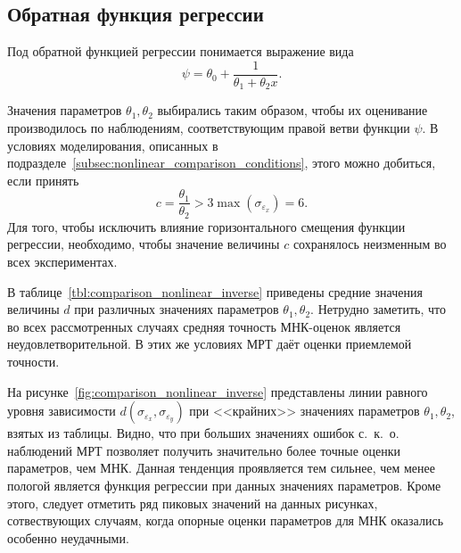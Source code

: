 \vspace{2\baselineskip}
\subsection{Обратная функция регрессии}

Под обратной функцией регрессии понимается выражение вида
\[ \psi = \theta_0 + \dfrac{1}{\theta_1 + \theta_2 x}. \]

Значения параметров \( \theta_1, \theta_2 \) выбирались таким образом, чтобы
их оценивание производилось по наблюдениям, соответствующим правой ветви функции \( \psi \).
В условиях моделирования, описанных в подразделе~\ref{subsec:nonlinear_comparison_conditions},
этого можно добиться, если принять
\[ c = \dfrac{\theta_1}{\theta_2} > 3 \max{(\sigma_{\varepsilon_x})} = 6. \]
Для того, чтобы исключить влияние горизонтального смещения функции регрессии,
необходимо, чтобы значение величины \( c \) сохранялось неизменным во всех экспериментах.

В таблице~\ref{tbl:comparison_nonlinear_inverse} приведены средние значения
величины \( d \) при различных значениях параметров \( \theta_1, \theta_2 \).
Нетрудно заметить, что во всех рассмотренных случаях средняя точность МНК-оценок
является неудовлетворительной.
В этих же условиях МРТ даёт оценки приемлемой точности.

На рисунке~\ref{fig:comparison_nonlinear_inverse} представлены линии равного уровня зависимости
\( d(\sigma_{\varepsilon_x}, \sigma_{\varepsilon_y}) \) при <<крайних>> значениях параметров
\( \theta_1, \theta_2 \), взятых из таблицы.
Видно, что при больших значениях ошибок с.~к.~о. наблюдений
МРТ позволяет получить значительно более точные оценки параметров, чем МНК.
Данная тенденция проявляется тем сильнее,
чем менее пологой является функция регрессии при данных значениях параметров.
Кроме этого, следует отметить ряд пиковых значений на данных рисунках,
сотвествующих случаям, когда опорные оценки параметров для МНК оказались
особенно неудачными.

